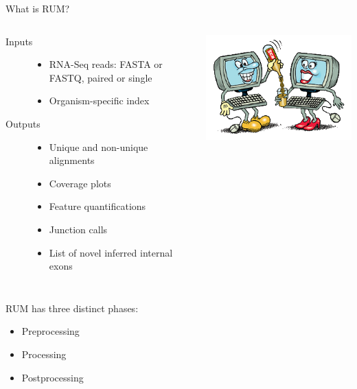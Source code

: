 \documentclass{beamer}
\begin{document}
\begin{frame}{What is RUM?}
  \begin{columns}
    \column{3in}
    \begin{description}
    \item [Inputs]
      \begin{itemize}
      \item RNA-Seq reads: FASTA or FASTQ, paired or single
      \item Organism-specific index
      \end{itemize}
      \pause
    \item [Outputs]
      \begin{itemize}
      \item Unique and non-unique alignments
      \item Coverage plots
      \item Feature quantifications
      \item Junction calls
      \item List of novel inferred internal exons
      \end{itemize}
    \end{description}
    \column{2.5in}
    \includegraphics[scale=0.4]{rumpouring2.png}
  \end{columns}
\end{frame}

\begin{frame}
  RUM has three distinct phases:
  \begin{itemize}
  \item Preprocessing
  \item Processing
  \item Postprocessing
  \end{itemize}
\end{frame}
\end{document}
